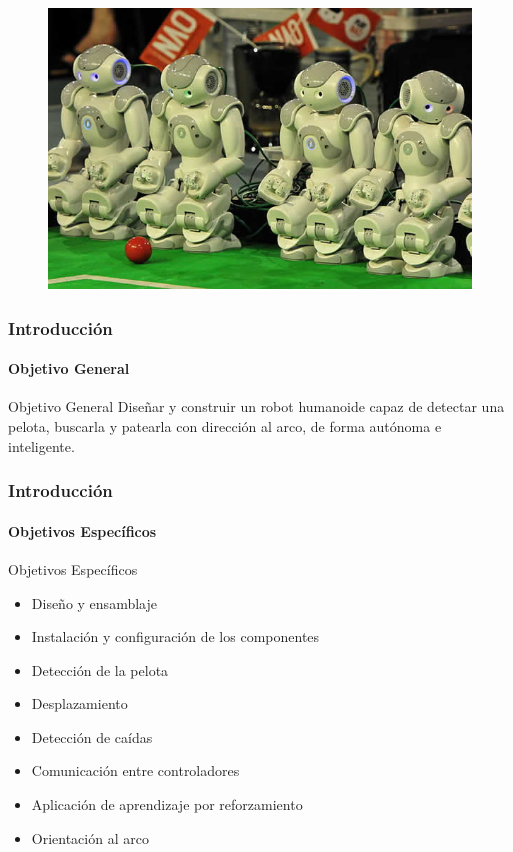 \documentclass{beamer}
\begin{document}
\begin{frame}
\begin{figure}
\includegraphics[scale=0.5]{13-06-28-robocup-eindhoven.jpg} 

\end{figure}
\end{frame}


\begin{frame}
  \frametitle{Introducci\'{o}n}
  \framesubtitle{Objetivo General}

  \begin{block}{Objetivo General}
	Dise\~nar y construir un robot humanoide capaz de detectar una pelota, buscarla y patearla con direcci\'on al arco, de forma aut\'onoma e inteligente.
   \end{block}
\end{frame}
\begin{frame}
  \frametitle{Introducci\'{o}n}
  \framesubtitle{Objetivos Espec\'{i}ficos}
  \begin{block}{Objetivos Espec\'{i}ficos}
  \begin{itemize}
    \item Dise\~no y ensamblaje
    \item Instalaci\'on y configuraci\'on de los componentes 
    \item Detecci\'on de la pelota
    \item Desplazamiento 
    \item Detecci\'on de ca\'idas
    \item Comunicaci\'on entre controladores
    \item Aplicación de aprendizaje por reforzamiento 
    \item Orientaci\'on al arco 
    \end{itemize}
  \end{block}
\end{frame}
\end{document}
